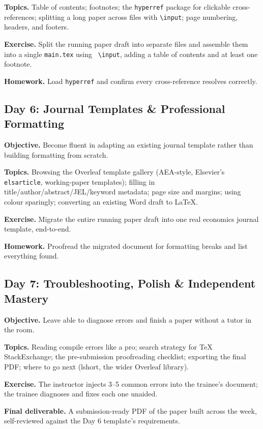 \documentclass[11pt,a4paper]{article}
\begin{document}
\textbf{Topics.} Table of contents; footnotes; the \texttt{hyperref}
package for clickable cross-references; splitting a long paper across
files with \texttt{\textbackslash input}; page numbering, headers, and
footers.

\textbf{Exercise.} Split the running paper draft into separate files
and assemble them into a single \texttt{main.tex} using \texttt{
\textbackslash input}, adding a table of contents and at least one
footnote.

\textbf{Homework.} Load \texttt{hyperref} and confirm every
cross-reference resolves correctly.

\vspace{6pt}
\subsection*{Day 6: Journal Templates \& Professional Formatting}
\textbf{Objective.} Become fluent in adapting an existing journal
template rather than building formatting from scratch.

\textbf{Topics.} Browsing the Overleaf template gallery (AEA-style,
Elsevier's \texttt{elsarticle}, working-paper templates); filling in
title/author/abstract/JEL/keyword metadata; page size and margins;
using colour sparingly; converting an existing Word draft to LaTeX.

\textbf{Exercise.} Migrate the entire running paper draft into one
real economics journal template, end-to-end.

\textbf{Homework.} Proofread the migrated document for formatting
breaks and list everything found.

\vspace{6pt}
\subsection*{Day 7: Troubleshooting, Polish \& Independent Mastery}
\textbf{Objective.} Leave able to diagnose errors and finish a paper
without a tutor in the room.

\textbf{Topics.} Reading compile errors like a pro; search strategy
for TeX StackExchange; the pre-submission proofreading checklist;
exporting the final PDF; where to go next (lshort, the wider Overleaf
library).

\textbf{Exercise.} The instructor injects 3--5 common errors into the
trainee's document; the trainee diagnoses and fixes each one unaided.

\textbf{Final deliverable.} A submission-ready PDF of the paper built
across the week, self-reviewed against the Day 6 template's
requirements.
\end{document}
